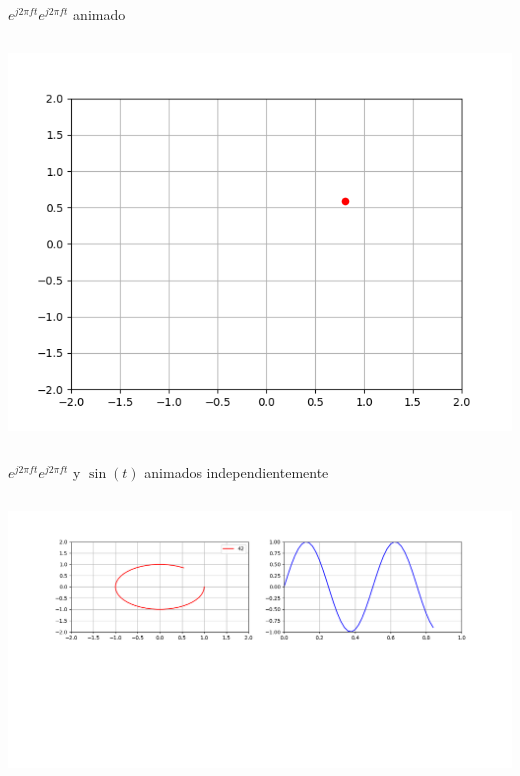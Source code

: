 \begin{frame}{$e^{j2\pi ft}$}{$e^{j2\pi ft}$ animado }
   \handsonicon
   \begin{columns}[onlytextwidth]
      
      \centering\includegraphics[width=1.0\textwidth]{3_clase/euler1}
   \end{columns}
   \vfill
\end{frame}
\begin{frame}{$e^{j2\pi ft}$}{$e^{j2\pi ft}$ y $\sin(t)$ animados independientemente}
   \handsonicon
   \begin{columns}[onlytextwidth]
      
      \centering\includegraphics[width=1.0\textwidth]{3_clase/euler2}
   \end{columns}
   \vfill
\end{frame}
